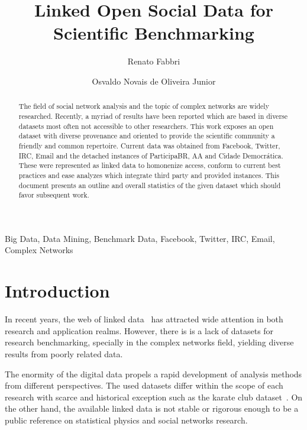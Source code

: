 \documentclass[review]{elsarticle}
\begin{document}
%
\begin{frontmatter}
%
\title{Linked Open Social Data for Scientific Benchmarking}
%
\author[pwr]{Renato Fabbri}
%
\author[pwr]{Osvaldo Novais de Oliveira Junior}
%
\address[pwr]{S\~ao Carlos Institute of Physics, S\~ao Paulo
University, Brazil}
%
%
\begin{abstract}
The field of social network analysis and the topic of complex networks
are widely researched.
Recently, a myriad of results have been reported which are based in
diverse datasets most often not accessible to other researchers.
This work exposes an open dataset with diverse provenance and oriented
to provide the scientific community a friendly and common repertoire.
Current data was obtained from Facebook, Twitter, IRC, Email and the
detached instances of ParticipaBR, AA and Cidade Democr\'atica.
These were represented as linked data to homonenize access,
conform to current best practices and ease analyzes which integrate third
party and provided instances.
This document presents an outline and overall statistics of the given
dataset which should favor subsequent work.
\end{abstract}
%
\begin{keyword}
Big Data, Data Mining, Benchmark Data, Facebook, Twitter, IRC, Email, Complex Networks
\end{keyword}

\end{frontmatter}

\section{Introduction}
In recent years, the web of linked data~\cite{lee1} has attracted wide attention in
both research and application realms.
However, there is is a lack of datasets for research benchmarking,
specially in the complex networks field, yielding diverse results from 
poorly related data.

The enormity of the digital data propels a rapid development of analysis methods
from different perspectives.
The used datasets differ within the scope of each research with
scarce and historical exception such as the
karate club dataset~\cite{newmanBook}.
On the other hand, the available linked data is not 
stable or rigorous enough to be
a public reference on statistical physics and social networks research.
 
\end{document}
